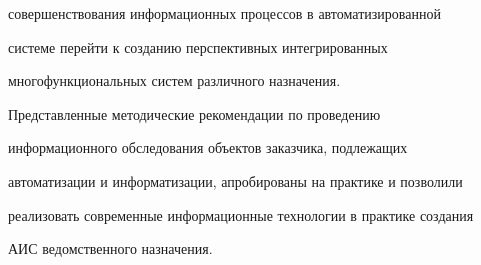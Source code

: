 совершенствования информационных процессов в автоматизированной 


системе перейти к созданию перспективных интегрированных 


многофункциональных систем различного назначения.


      


      Представленные методические рекомендации по проведению 


информационного обследования объектов заказчика, подлежащих 


автоматизации и информатизации, апробированы на практике и позволили 


реализовать современные информационные технологии в практике создания 


АИС ведомственного назначения.     





